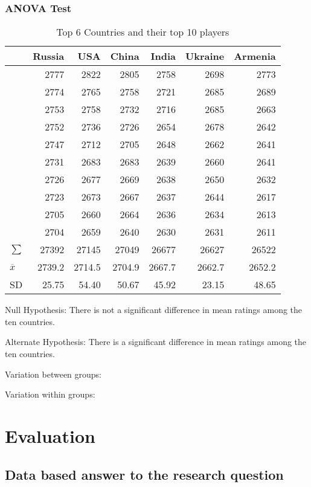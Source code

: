 \documentclass[12pt]{article}
\begin{document}
\subsubsection{ANOVA Test}

\begin{table}[H]
\begin{center}
\begin{tabular}{lrrrrrr}
 & Russia & USA & China & India & Ukraine & Armenia\\
\hline
 & 2777 & 2822 & 2805 & 2758 & 2698 & 2773\\
 & 2774 & 2765 & 2758 & 2721 & 2685 & 2689\\
 & 2753 & 2758 & 2732 & 2716 & 2685 & 2663\\
 & 2752 & 2736 & 2726 & 2654 & 2678 & 2642\\
 & 2747 & 2712 & 2705 & 2648 & 2662 & 2641\\
 & 2731 & 2683 & 2683 & 2639 & 2660 & 2641\\
 & 2726 & 2677 & 2669 & 2638 & 2650 & 2632\\
 & 2723 & 2673 & 2667 & 2637 & 2644 & 2617\\
 & 2705 & 2660 & 2664 & 2636 & 2634 & 2613\\
 & 2704 & 2659 & 2640 & 2630 & 2631 & 2611\\
\(\sum\) & 27392 & 27145 & 27049 & 26677 & 26627 & 26522\\
 \(\overline{x}\) & 2739.2 & 2714.5 & 2704.9 & 2667.7 & 2662.7 & 2652.2\\
SD & 25.75 & 54.40 & 50.67 & 45.92 & 23.15 & 48.65\\
\end{tabular}
\caption{Top 6 Countries and their top 10 players}
\end{center}
\end{table}

Null Hypothesis: There is not a significant difference in mean ratings among the ten countries. 

Alternate Hypothesis: There is a significant difference in mean ratings among the ten countries. 

Variation between groups:

Variation within groups:


\section{Evaluation}
\subsection{Data based answer to the research question}
\end{document}
